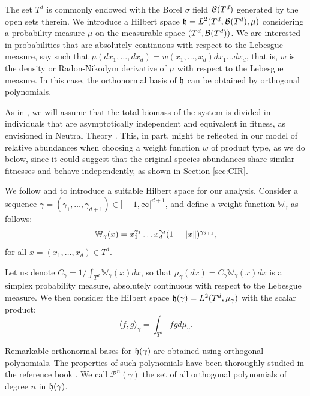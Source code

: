 \documentclass[12pt]{article}
\newcommand{\w}[1]{\mathbb{W}_{#1}}
\newcommand{\pol}[2]{\mathcal{P}^{#1}(#2)}
\newcommand{\sca}[3]{\langle #1,#2\rangle_{#3}}
\begin{document}
The set $T^d$ is commonly endowed with the Borel $\sigma$ field $\mathcal{B}(T^d)$ generated by the open sets therein. We introduce a Hilbert space ${\mathfrak{h}}=L^2(T^d,\mathcal{B}(T^d),\mu)$ considering a probability measure $\mu$ on the measurable space $(T^d,\mathcal{B}(T^d))$. We are interested in probabilities that are absolutely continuous with respect to the Lebesgue measure, say such that $\mu(dx_1,\ldots,dx_d)=w(x_1,\ldots,x_d)dx_1\ldots dx_d$, that is, $w$ is the density or Radon-Nikodym derivative of $\mu$ with respect to the Lebesgue measure. In this case, the orthonormal basis of ${\mathfrak{h}}$ can be obtained by orthogonal polynomials.

As in \cite{marquet2017proportional}, we will assume that the total biomass of the system is divided in individuals that are
asymptotically independent and equivalent in fitness, as envisioned in Neutral Theory \cite{hubbell2011unified}. This, in part, might be reflected in our model of relative abundances when choosing  a weight function $w$ of product type, as we do below, since it could suggest that the original species abundances share similar fitnesses and behave independently, as shown in Section \ref{sec:CIR}. 

We follow \citep{Aktas} and \citep{Dunkl-Xu} to introduce a suitable Hilbert space for our analysis. Consider a sequence $\gamma=(\gamma_1,\ldots,\gamma_{d+1})\in]-1,\infty[^{d+1}$, and define a weight function $\w{\gamma}$ as follows:
\begin{equation}\label{weight-function}
    \w{\gamma}(x)=x_1^{\gamma_1}\ldots x_d^{\gamma_d}(1-\norm{x})^{\gamma_{d+1}},
\end{equation}
for all $x=(x_1,\ldots,x_d)\in T^d$.

Let us denote $C_\gamma=1/ {\int_{T^d}\w{\gamma}(x)dx}$, so that $\mu_\gamma (dx)=C_\gamma\w{\gamma}(x)dx$ is a simplex probability measure, absolutely continuous with respect to the Lebesgue measure. We then consider the Hilbert space ${\mathfrak{h}} (\gamma)=L^2(T^d,\mu_{\gamma})$ with the scalar product:
\begin{equation}
 \sca{f}{g}{\gamma}=\int_{T^d}fgd\mu_\gamma  . 
\end{equation}

Remarkable orthonormal bases for ${\mathfrak{h}}(\gamma)$ are obtained using orthogonal polynomials. The properties of such polynomials have been thoroughly studied in the reference book \citep{Dunkl-Xu}. We call $\pol{n}{\gamma}$ the set of all orthogonal polynomials of degree $n$ in ${\mathfrak{h}} (\gamma)$.
\end{document}
